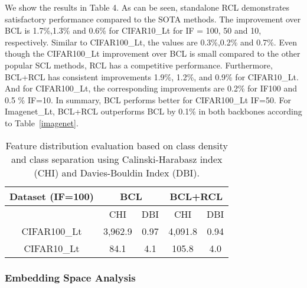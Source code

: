 We show the results in Table 4. As can be seen, standalone RCL demonstrates satisfactory performance compared to the SOTA methods. The improvement over BCL is 1.7\%,1.3\% and 0.6\% for CIFAR10\_Lt for IF = 100, 50 and 10, respectively. Similar to CIFAR100\_Lt, the values are 0.3\%,0.2\% and 0.7\%. Even though the CIFAR100\_Lt improvement over BCL is small compared to the other popular  SCL methods, RCL has a competitive performance.  Furthermore, BCL+RCL has consistent improvements 1.9\%, 1.2\%, and 0.9\%  for CIFAR10\_Lt. And for CIFAR100\_Lt, the corresponding improvements are  0.2\% for IF100 and 0.5 \% IF=10. In summary,  BCL performs better for CIFAR100\_Lt IF=50. For Imagenet\_Lt, BCL+RCL outperforms BCL by 0.1\% in both backbones according to Table~\ref{imagenet}.
\begin{table}[ht]
\centering
\caption{ Feature distribution evaluation based on class density and class separation using Calinski-Harabasz index (CHI) and Davies-Bouldin Index (DBI).  }
\begin{tabular}{ ccccc }

\hline
\textbf{Dataset (IF=100)}&\multicolumn{2}{c}{\textbf{BCL}}&\multicolumn{2}{c}{\textbf{BCL+RCL}}\\
\hline
&CHI &DBI & CHI&DBI \\
CIFAR100\_Lt &3,962.9&0.97&4,091.8 &0.94\\
CIFAR10\_Lt &84.1&4.1&105.8&4.0\\
\hline
\end{tabular}
\label{vmes}
\end{table}

\subsubsection{Embedding Space Analysis}

